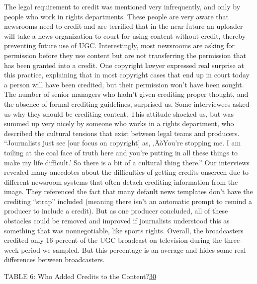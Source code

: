 \documentclass[symmetric, notoc, nobib]{towcenter-book}
\begin{document}
The legal requirement to credit was mentioned very infrequently, and only
by people who work in rights departments. These people are very aware
that newsrooms need to credit and are terrified that in the near future an
uploader will take a news organization to court for using content without
credit, thereby preventing future use of UGC.
Interestingly, most newsrooms are asking for permission before they use
content but are not transferring the permission that has been granted into
a credit. One copyright lawyer expressed real surprise at this practice,
explaining that in most copyright cases that end up in court today a person
will have been credited, but their permission won't have been sought.
The number of senior managers who hadn't given crediting proper thought,
and the absence of formal crediting guidelines, surprised us. Some interviewees
asked us why they should be crediting content. This attitude
shocked us, but was summed up very nicely by someone who works in a
rights department, who described the cultural tensions that exist between
legal teams and producers. ``Journalists just see [our focus on copyright] as,
‚ÄòYou're stopping me. I am toiling at the coal face of truth here and you're
putting in all these things to make my life difficult.' So there is a bit of a cultural
thing there.''
Our interviews revealed many anecdotes about the difficulties of getting
credits onscreen due to different newsroom systems that often detach
crediting information from the image. They referenced the fact that many
default news templates don't have the crediting ``strap'' included (meaning
there isn't an automatic prompt to remind a producer to include a credit).
But as one producer concluded, all of these obstacles could be removed
and improved if journalists understood this as something that was nonnegotiable,
like sports rights.
Overall, the broadcasters credited only 16 percent of the UGC broadcast on
television during the three-week period we sampled. But this percentage is
an average and hides some real differences between broadcasters.

TABLE 6: Who Added Credits to the Content?{\href{#endnotes}{30}}
\end{document}
